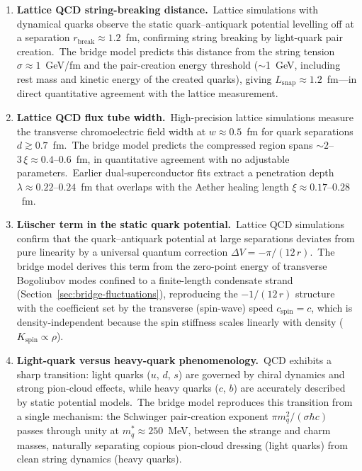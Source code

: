 ﻿\documentclass[12pt,letterpaper]{article}
\begin{document}
\begin{enumerate}[leftmargin=2em]
  \item \textbf{Lattice QCD string-breaking distance.}\ Lattice simulations
    with dynamical quarks \cite{bali2005,bulava2019} observe the static
    quark--antiquark potential levelling off at a separation
    $r_{\mathrm{break}} \approx 1.2$~fm, confirming string breaking by
    light-quark pair creation.\ The bridge model predicts this distance
    from the string tension $\sigma \approx 1$~GeV/fm and the
    pair-creation energy threshold ($\sim$1~GeV, including rest mass and
    kinetic energy of the created quarks), giving
    $L_{\mathrm{snap}} \approx 1.2$~fm---in direct quantitative agreement
    with the lattice measurement.

  \item \textbf{Lattice QCD flux tube width.}\ High-precision lattice
    simulations \cite{cardoso2013,cea2024} measure the transverse
    chromoelectric field width at $w \approx 0.5$~fm for quark separations
    $d \gtrsim 0.7$~fm.\ The bridge model predicts the compressed region
    spans $\sim\!2$--$3\,\xi \approx 0.4$--$0.6$~fm, in quantitative
    agreement with no adjustable parameters.\ Earlier dual-superconductor
    fits \cite{cea2012} extract a penetration depth
    $\lambda \approx 0.22$--$0.24$~fm that overlaps with the Aether healing
    length $\xi \approx 0.17$--$0.28$~fm.

  \item \textbf{L\"uscher term in the static quark potential.}\ Lattice QCD
    simulations \cite{juge2004,luscher2002} confirm that the quark--antiquark
    potential at large separations deviates from pure linearity by a
    universal quantum correction $\Delta V = -\pi/(12\,r)$.\ The bridge
    model derives this term from the zero-point energy of transverse
    Bogoliubov modes confined to a finite-length condensate strand
    (Section~\ref{sec:bridge-fluctuations}), reproducing the $-1/(12\,r)$
    structure with the coefficient set by the transverse (spin-wave) speed
    $c_{\mathrm{spin}} = c$, which is density-independent because the spin
    stiffness scales linearly with density ($K_{\mathrm{spin}} \propto \rho$).

  \item \textbf{Light-quark versus heavy-quark phenomenology.}\ QCD exhibits
    a sharp transition: light quarks ($u$, $d$, $s$) are governed by chiral
    dynamics and strong pion-cloud effects, while heavy quarks ($c$, $b$)
    are accurately described by static potential models.\ The bridge model
    reproduces this transition from a single mechanism: the Schwinger
    pair-creation exponent $\pi m_q^2/(\sigma\hbar c)$ passes through
    unity at $m_q^* \approx 250$~MeV, between the strange and charm masses,
    naturally separating copious pion-cloud dressing (light quarks) from
    clean string dynamics (heavy quarks).


\end{enumerate}
\end{document}
